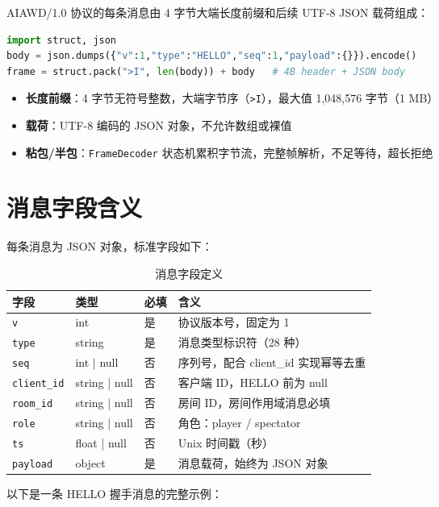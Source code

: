 \documentclass[12pt,a4paper]{ctexbook}
\begin{document}
AIAWD/1.0 协议的每条消息由 4 字节大端长度前缀和后续 UTF-8 JSON 载荷组成：

\begin{lstlisting}[language=python,caption={帧构造（Python）}]
import struct, json
body = json.dumps({"v":1,"type":"HELLO","seq":1,"payload":{}}).encode()
frame = struct.pack(">I", len(body)) + body   # 4B header + JSON body
\end{lstlisting}

\begin{itemize}
  \item \textbf{长度前缀}：4 字节无符号整数，大端字节序（\texttt{>I}），最大值 1,048,576 字节（1 MB）
  \item \textbf{载荷}：UTF-8 编码的 JSON 对象，不允许数组或裸值
  \item \textbf{粘包/半包}：\texttt{FrameDecoder} 状态机累积字节流，完整帧解析，不足等待，超长拒绝
\end{itemize}

\section{消息字段含义}

每条消息为 JSON 对象，标准字段如下：

\begin{table}[htbp]
\centering
\caption{消息字段定义}
\begin{tabular}{@{}llll@{}}
\toprule
\textbf{字段} & \textbf{类型} & \textbf{必填} & \textbf{含义} \\
\midrule
\texttt{v} & int & 是 & 协议版本号，固定为 1 \\
\texttt{type} & string & 是 & 消息类型标识符（28 种） \\
\texttt{seq} & int | null & 否 & 序列号，配合 client\_id 实现幂等去重 \\
\texttt{client\_id} & string | null & 否 & 客户端 ID，HELLO 前为 null \\
\texttt{room\_id} & string | null & 否 & 房间 ID，房间作用域消息必填 \\
\texttt{role} & string | null & 否 & 角色：player / spectator \\
\texttt{ts} & float | null & 否 & Unix 时间戳（秒） \\
\texttt{payload} & object & 是 & 消息载荷，始终为 JSON 对象 \\
\bottomrule
\end{tabular}
\end{table}

以下是一条 HELLO 握手消息的完整示例：
\end{document}
